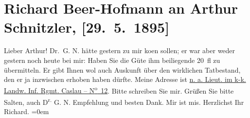 

         
         \renewcommand{\erwaehntePersonen}{Personen: Gabor Nobl, Felix Salten}
         \renewcommand{\erwaehnteOrte}{Orte: Caslau, Wien}
         \renewcommand{\erwaehnteWerke}{}
               \section[Richard Beer-Hofmann an Arthur Schnitzler, {[}29. 5. 1895{]}]{ Richard Beer-Hofmann an Arthur Schnitzler,
               {[}29. 5. 1895{]}}\nopagebreak{}\rehead{ }\begin{ledgroupsized}[t]{13cm}\normalsize\beginnumbering \toendnotes[C]{\smallbreak\pagebreak[2]} 
\pstart
           \noindent{}{\pb}Lieber Arthur! Dr. G. N. hätte
               gestern zu mir ko{\geminationm}en sollen; er war aber weder gestern
               noch heute bei mir: Haben Sie die Güte ihm beiliegende 20 fl zu übermitteln. Er
               gibt Ihnen wol auch Auskunft über den wirklichen Tatbestand, den er ja inzwischen
               erhoben {\pb}haben dürfte. Meine
               Adresse ist\pend
           \pstart
           \uline{n. a. Lieut. im k-k. Landw. Inf. Rgmt. Caslau – N\textsuperscript{o} 12}. Bitte
               schreiben Sie mir. Grüßen Sie bitte Salten, auch
                  D\textsuperscript{r.}{ }G. N. Empfehlung und besten Dank.\pend
           \pstart
           {\pb}Mir ist mis.\pend
           \pstart
           Herzlichst Ihr{\\[\baselineskip]}\spacefill\mbox{Richard.}\pend
           \leftskip=0em{}
         
         \endnumbering{}\end{ledgroupsized}  \newcommand{\dateiname}{L00446}\newcommand{\titel}{Richard Beer-Hofmann an Arthur Schnitzler, [29. 5. 1895]}\newcommand{\editorInnen}{Martin Anton Müller und Gerd-Hermann Susen}
      
